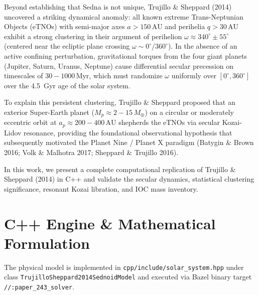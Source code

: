 \documentclass[11pt,a4paper]{article}
\begin{document}
Beyond establishing that Sedna is not unique, Trujillo \& Sheppard (2014) uncovered a striking dynamical anomaly: all known extreme Trans-Neptunian Objects (eTNOs) with semi-major axes $a > 150\,\text{AU}$ and perihelia $q > 30\,\text{AU}$ exhibit a strong clustering in their argument of perihelion $\omega \approx 340^\circ \pm 55^\circ$ (centered near the ecliptic plane crossing $\omega \sim 0^\circ / 360^\circ$). In the absence of an active confining perturbation, gravitational torques from the four giant planets (Jupiter, Saturn, Uranus, Neptune) cause differential secular precession on timescales of $30 - 1000\,\text{Myr}$, which must randomize $\omega$ uniformly over $[0^\circ, 360^\circ]$ over the 4.5~Gyr age of the solar system.

To explain this persistent clustering, Trujillo \& Sheppard proposed that an exterior Super-Earth planet ($M_p \approx 2 - 15\,M_\oplus$) on a circular or moderately eccentric orbit at $a_p \approx 200 - 400\,\text{AU}$ shepherds the eTNOs via secular Kozai-Lidov resonance, providing the foundational observational hypothesis that subsequently motivated the Planet Nine / Planet X paradigm (Batygin \& Brown 2016; Volk \& Malhotra 2017; Sheppard \& Trujillo 2016).

In this work, we present a complete computational replication of Trujillo \& Sheppard (2014) in C++ and validate the secular dynamics, statistical clustering significance, resonant Kozai libration, and IOC mass inventory.

\section{C++ Engine \& Mathematical Formulation}
The physical model is implemented in \texttt{cpp/include/solar\_system.hpp} under class \texttt{TrujilloSheppard2014SednoidModel} and executed via Bazel binary target \texttt{//:paper\_243\_solver}.
\end{document}

